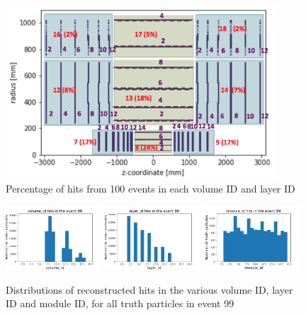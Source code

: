 \begin{figure}[!hbt]
\centering
\includegraphics[width=0.9\textwidth]{./plots/DetectorVolumeIDLayerID.png}
\caption{Percentage of hits from 100 events in each volume ID and layer ID}
\label{fig:DetectorVolumeIDLayerID}
\end{figure}

\begin{figure}[!htb]
\centering
\includegraphics[width=0.32\textwidth]{plots/DataExploration_volume_id.pdf}
\includegraphics[width=0.32\textwidth]{plots/DataExploration_layer_id.pdf}
\includegraphics[width=0.32\textwidth]{plots/DataExploration_module_id.pdf}
\caption{Distributions of reconstructed hits in the various volume ID, layer ID and module ID, for all truth particles in event 99}
\label{fig:DetectorHits}
\end{figure}

